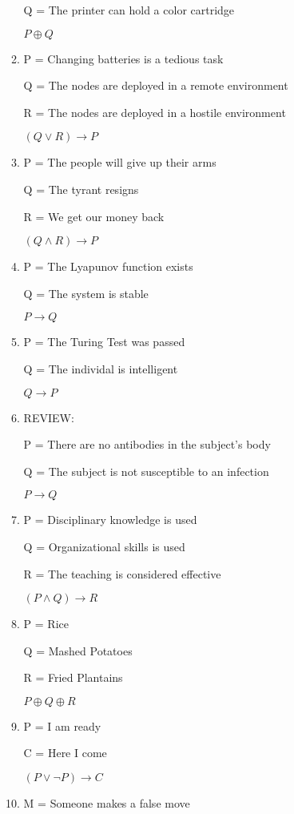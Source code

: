 \documentclass{article}
\begin{document}
\begin{enumerate}
\begin{enumerate}
        Q = The printer can hold a color cartridge

        $P \oplus Q$
        \item
        P = Changing batteries is a tedious task

        Q = The nodes are deployed in a remote environment

        R = The nodes are deployed in a hostile environment

        $(Q \lor R) \rightarrow P$
        \item
        P = The people will give up their arms

        Q = The tyrant resigns

        R = We get our money back

        $(Q \land R) \rightarrow P$
        \item
        P = The Lyapunov function exists

        Q = The system is stable

        $P \rightarrow Q$
        \item
        P = The Turing Test was passed

        Q = The individal is intelligent

        $Q \rightarrow P$
        \item
        REVIEW:

        P = There are no antibodies in the subject’s body

        Q = The subject is not susceptible to an infection

        $P \rightarrow Q$
        \item
        P = Disciplinary knowledge is used

        Q = Organizational skills is used

        R = The teaching is considered effective

        $(P \land Q) \rightarrow R$
        \item
        P = Rice

        Q = Mashed Potatoes

        R = Fried Plantains

        $P \oplus Q \oplus R$
        \item
        P = I am ready

        C = Here I come

        $(P \lor \neg P) \rightarrow C$
        \item
        M = Someone makes a false move


\end{enumerate}
\end{enumerate}
\end{document}
